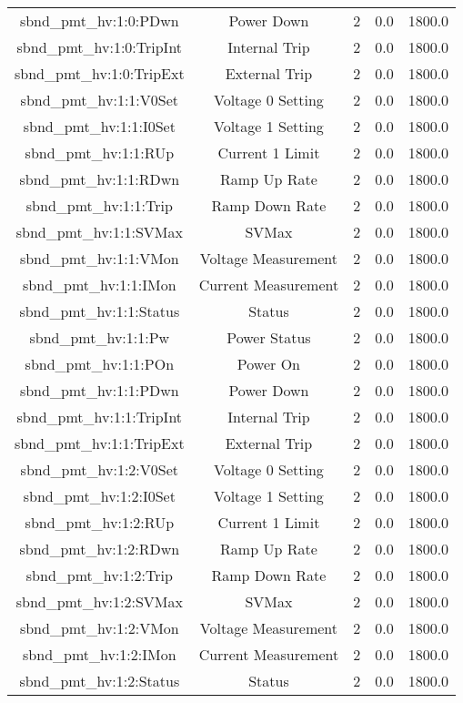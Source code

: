 \begin{center}
\begin{longtable}{c | c c c c }
sbnd\_pmt\_hv:1:0:PDwn & Power Down & 2 & 0.0 & 1800.0\\ 
sbnd\_pmt\_hv:1:0:TripInt & Internal Trip & 2 & 0.0 & 1800.0\\ 
sbnd\_pmt\_hv:1:0:TripExt & External Trip & 2 & 0.0 & 1800.0\\ 
sbnd\_pmt\_hv:1:1:V0Set & Voltage 0 Setting & 2 & 0.0 & 1800.0\\ 
sbnd\_pmt\_hv:1:1:I0Set & Voltage 1 Setting & 2 & 0.0 & 1800.0\\ 
sbnd\_pmt\_hv:1:1:RUp & Current 1 Limit & 2 & 0.0 & 1800.0\\ 
sbnd\_pmt\_hv:1:1:RDwn & Ramp Up Rate & 2 & 0.0 & 1800.0\\ 
sbnd\_pmt\_hv:1:1:Trip & Ramp Down Rate & 2 & 0.0 & 1800.0\\ 
sbnd\_pmt\_hv:1:1:SVMax & SVMax & 2 & 0.0 & 1800.0\\ 
sbnd\_pmt\_hv:1:1:VMon & Voltage Measurement & 2 & 0.0 & 1800.0\\ 
sbnd\_pmt\_hv:1:1:IMon & Current Measurement & 2 & 0.0 & 1800.0\\ 
sbnd\_pmt\_hv:1:1:Status & Status & 2 & 0.0 & 1800.0\\ 
sbnd\_pmt\_hv:1:1:Pw & Power Status & 2 & 0.0 & 1800.0\\ 
sbnd\_pmt\_hv:1:1:POn & Power On & 2 & 0.0 & 1800.0\\ 
sbnd\_pmt\_hv:1:1:PDwn & Power Down & 2 & 0.0 & 1800.0\\ 
sbnd\_pmt\_hv:1:1:TripInt & Internal Trip & 2 & 0.0 & 1800.0\\ 
sbnd\_pmt\_hv:1:1:TripExt & External Trip & 2 & 0.0 & 1800.0\\ 
sbnd\_pmt\_hv:1:2:V0Set & Voltage 0 Setting & 2 & 0.0 & 1800.0\\ 
sbnd\_pmt\_hv:1:2:I0Set & Voltage 1 Setting & 2 & 0.0 & 1800.0\\ 
sbnd\_pmt\_hv:1:2:RUp & Current 1 Limit & 2 & 0.0 & 1800.0\\ 
sbnd\_pmt\_hv:1:2:RDwn & Ramp Up Rate & 2 & 0.0 & 1800.0\\ 
sbnd\_pmt\_hv:1:2:Trip & Ramp Down Rate & 2 & 0.0 & 1800.0\\ 
sbnd\_pmt\_hv:1:2:SVMax & SVMax & 2 & 0.0 & 1800.0\\ 
sbnd\_pmt\_hv:1:2:VMon & Voltage Measurement & 2 & 0.0 & 1800.0\\ 
sbnd\_pmt\_hv:1:2:IMon & Current Measurement & 2 & 0.0 & 1800.0\\ 
sbnd\_pmt\_hv:1:2:Status & Status & 2 & 0.0 & 1800.0\\ 

\end{longtable}
\end{center}

